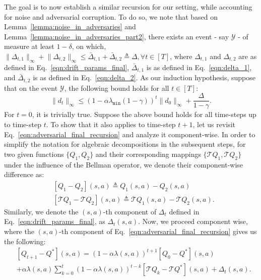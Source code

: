 \documentclass{article}
\newcommand{\mc}{\mathcal}
\begin{document}
The goal is to now establish a similar recursion for our setting, while accounting for noise and adversarial corruption. To do so, we note that based on Lemma~\ref{lemma:noise_in_adversaries} and Lemma~\ref{lemma:noise_in_adversaries_part2}, there exists an event - say $\mc{Y}$ - of measure at least $1-\delta$, on which, $\rVert\Delta_{t,1}\lVert_{\infty}+\lVert\Delta_{t,2}\rVert_{\infty} \leq \bar{\Delta}_{t,1} + \bar{\Delta}_{t,2} \triangleq \Delta, \forall t \in [T]$, where $\Delta_{t,1}$ and $\Delta_{t,2}$ are as defined in Eq.~\eqref{eqn:drift_params_final}, \(\bar{\Delta}_{t,1}\) is as defined in Eq.~\eqref{eqn:delta_1}, and \(\bar{\Delta}_{t,2}\) is as defined in Eq.~\eqref{eqn:delta_2}. As our induction hypothesis, suppose that on the event \( \mathcal{Y} \), the following bound holds for all \( t \in [T] \): 
\begin{equation}\label{eqn:new_claim_adversary}
   \lVert d_t \rVert_{\infty} \leq \left(1 - \alpha \lambda_{\texttt{min}}(1 - \gamma)\right)^t \lVert d_0 \rVert_{\infty}+ \frac{\Delta}{1 - \gamma}.
\end{equation}
For \(t=0\), it is trivially true. Suppose the above bound holds for all time-steps up to time-step $t$. To show that it also applies to time-step $t+1$, let us revisit Eq.~\eqref{eqn:adversarial_final_recursion} and analyze it component-wise. In order to simplify the notation for algebraic decompositions in the subsequent steps, for two given functions \( \{Q_1, Q_2\} \) and their corresponding mappings \( \{\mathcal{T} Q_1, \mathcal{T} Q_2\} \) under the influence of the Bellman operator, we denote their component-wise difference as:
\begin{equation}
\begin{aligned}
&[Q_1 - Q_2](s,a) \triangleq Q_1(s,a) - Q_2(s,a)\\
&[\mathcal{T} Q_1 - \mathcal{T} Q_2](s,a) \triangleq \mathcal{T} Q_1(s,a) - \mathcal{T} Q_2(s,a). 
\end{aligned}
\end{equation}
 Similarly, we denote the \((s,a)\)-th component of \( \Delta_t \) defined in Eq.~\eqref{eqn:drift_params_final}, as \( \Delta_t(s,a) \). Now, we proceed component wise, where the $(s,a)$-{th} component of Eq.~\eqref{eqn:adversarial_final_recursion} gives us the following:
\begin{equation}\label{eqn:new_recursion_adversary}
\begin{aligned}
    &[Q_{t+1} - Q^*](s,a) = (1 - \alpha \lambda(s,a))^{t+1} [Q_0 - Q^*](s,a) \\
    & + \alpha \lambda(s,a) \sum_{k=0}^{t} (1 - \alpha \lambda(s,a))^{t-k} [\mathcal{T} Q_k - \mathcal{T} Q^*](s,a) + \Delta_t(s,a).
\end{aligned}
\end{equation}
\end{document}
